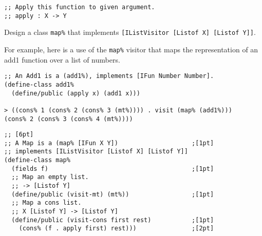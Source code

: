 \documentclass[12pt]{article}                   %
\newenvironment{solution}{}{}
\begin{document}
\begin{problem}
\begin{enumerate}
\begin{verbatim}
;; Apply this function to given argument.
;; apply : X -> Y
\end{verbatim}

Design a class \verb|map%| that implements
\verb|[IListVisitor [Listof X] [Listof Y]]|.

For example, here is a use of the \verb|map%| visitor that maps the
representation of an add1 function over a list of numbers.

\begin{verbatim}
;; An Add1 is a (add1%), implements [IFun Number Number].
(define-class add1%
  (define/public (apply x) (add1 x)))

> ((cons% 1 (cons% 2 (cons% 3 (mt%)))) . visit (map% (add1%)))
(cons% 2 (cons% 3 (cons% 4 (mt%)))) 
\end{verbatim}

\begin{solution}
\begin{verbatim}
;; [6pt]
;; A Map is a (map% [IFun X Y])                    ;[1pt] 
;; implements [IListVisitor [Listof X] [Listof Y]] 
(define-class map%
  (fields f)                                       ;[1pt] 
  ;; Map an empty list.
  ;; -> [Listof Y]
  (define/public (visit-mt) (mt%))                 ;[1pt] 
  ;; Map a cons list.
  ;; X [Listof Y] -> [Listof Y]
  (define/public (visit-cons first rest)           ;[1pt] 
    (cons% (f . apply first) rest)))               ;[2pt] 
\end{verbatim}
\end{solution}

\end{enumerate}


\end{problem}

\end{document}
